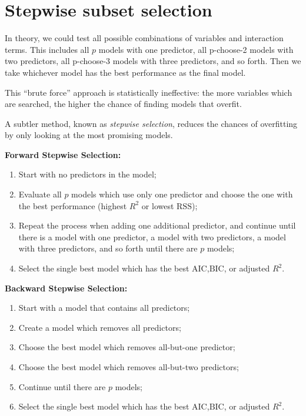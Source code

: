 \documentclass[
  openany]{book}
\providecommand{\tightlist}{%
  \setlength{\itemsep}{0pt}\setlength{\parskip}{0pt}}
\begin{document}
\hypertarget{stepwise-subset-selection}{%
\section{Stepwise subset selection}\label{stepwise-subset-selection}}

In theory, we could test all possible combinations of variables and interaction terms. This includes all \(p\) models with one predictor, all p-choose-2 models with two predictors, all p-choose-3 models with three predictors, and so forth. Then we take whichever model has the best performance as the final model.

This ``brute force'' approach is statistically ineffective: the more variables which are searched, the higher the chance of finding models that overfit.

A subtler method, known as \emph{stepwise selection}, reduces the chances of overfitting by only looking at the most promising models.

\textbf{Forward Stepwise Selection:}

\begin{enumerate}
\def\labelenumi{\arabic{enumi}.}
\tightlist
\item
  Start with no predictors in the model;
\item
  Evaluate all \(p\) models which use only one predictor and choose the one with the best performance (highest \(R^2\) or lowest \(\text{RSS}\));
\item
  Repeat the process when adding one additional predictor, and continue until there is a model with one predictor, a model with two predictors, a model with three predictors, and so forth until there are \(p\) models;
\item
  Select the single best model which has the best \(\text{AIC}\),\(\text{BIC}\), or adjusted \(R^2\).
\end{enumerate}

\textbf{Backward Stepwise Selection:}

\begin{enumerate}
\def\labelenumi{\arabic{enumi}.}
\tightlist
\item
  Start with a model that contains all predictors;
\item
  Create a model which removes all predictors;
\item
  Choose the best model which removes all-but-one predictor;
\item
  Choose the best model which removes all-but-two predictors;
\item
  Continue until there are \(p\) models;
\item
  Select the single best model which has the best \(\text{AIC}\),\(\text{BIC}\), or adjusted \(R^2\).
\end{enumerate}
\end{document}
